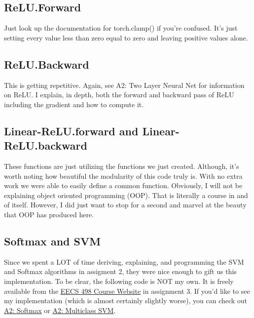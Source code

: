 \documentclass[12pt]{article}
\begin{document}
\subsection{ReLU.Forward}
Just look up the documentation for torch.clamp() if you're confused. It's just setting
every value less than zero equal to zero and leaving positive values alone. 

\subsection{ReLU.Backward}
This is getting repetitive. Again, see A2: Two Layer Neural Net for information on ReLU. 
I explain, in depth, both the forward and backward pass of ReLU including the gradient 
and how to compute it. 

\subsection{Linear-ReLU.forward and Linear-ReLU.backward}
These functions are just utilizing the functions we just created. Although, it's worth 
noting how beautiful the modularity of this code truly is. With no extra work we were 
able to easily define a common function. Obviously, I will not be explaining object oriented 
programming (OOP). That is literally a course in and of itself. However, I did just want to 
stop for a second and marvel at the beauty that OOP has produced here. 

\subsection{Softmax and SVM}
Since we spent a LOT of time deriving, explaining, and programming the SVM and Softmax
algorithms in assigment 2, they were nice enough to gift us this implementation. To be clear, 
the following code is NOT my own. It is freely available from the 
\href{https://web.eecs.umich.edu/~justincj/teaching/eecs498/WI2022/assignment3.html} 
{EECS 498 Course Website} in assignment 3. If you'd like to see my implementation (which is almost
certainly slightly worse), you can check out 
\href{https://github.com/bensmidt/EECS-498-DL-Computer-Vision/blob/main/A2/A2-Softmax.pdf}{A2: Softmax}
or \href{https://github.com/bensmidt/EECS-498-DL-Computer-Vision/blob/main/A2/A2-SVM.pdf}{A2: Multiclass SVM}.

\paragraph{}
\end{document}
